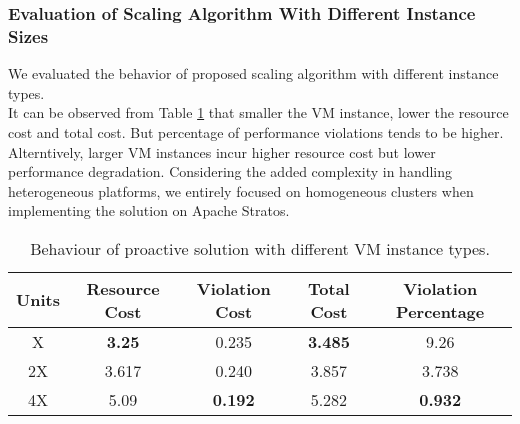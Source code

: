 \subsubsection{Evaluation of Scaling Algorithm With Different Instance Sizes}
We evaluated the behavior of proposed scaling algorithm with different instance types.\\

It can be observed from Table \ref{dif_instance} that smaller the VM instance, lower the resource cost and total cost. But percentage of performance violations tends to be higher. Alterntively, larger VM instances incur higher resource cost but lower performance degradation. Considering the added complexity in handling heterogeneous platforms, we entirely focused on homogeneous clusters when implementing the solution on Apache Stratos.

\begin{table}
\caption{Behaviour of proactive solution with different VM instance types.}
\centering
\label{dif_instance}
\begin{tabular}{|c|c|c|c|c|}
\hline
Units
& Resource Cost
& Violation Cost
& Total Cost
& Violation Percentage
\\ \hline
X
&\textbf{3.25} 
&0.235
&\textbf{3.485}
&9.26
\\ \hline
2X
&3.617
&0.240
&3.857
&3.738
\\ \hline
4X
&5.09
&\textbf{0.192}
&5.282
&\textbf{0.932}
\\ \hline
\end{tabular}
\end{table}